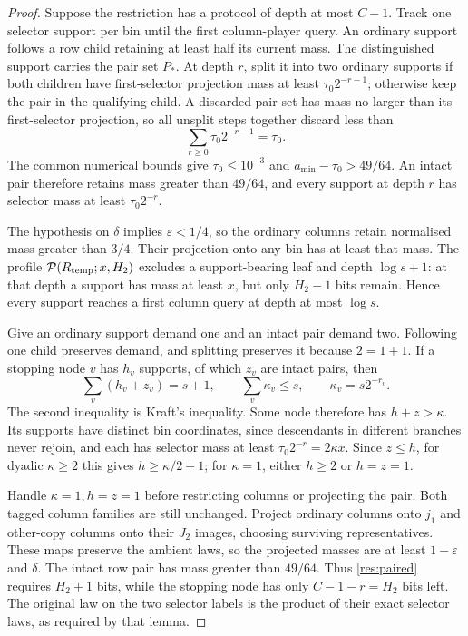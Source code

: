 \documentclass[11pt]{article} \usepackage[utf8]{inputenc}
\theoremstyle{plain} \newtheorem{theorem}{Theorem}[section]
\theoremstyle{definition} \newaliascnt{definition}{theorem}
\newcommand{\RP}[3]{\mathcal{P}(#1;#2,#3)}
\begin{document}
\begin{proof}
Suppose the restriction has a protocol of depth at most $C-1$. Track one
selector support per bin until the first column-player query. An ordinary
support follows a row child retaining at least half its current mass. The
distinguished support carries the pair set $P_*$. At depth $r$, split it into
two ordinary supports if both children have first-selector projection mass at
least $\tau_0 2^{-r-1}$; otherwise keep the pair in the qualifying child.
A discarded pair set has mass no larger than its first-selector projection,
so all unsplit steps together discard less than
\[
\sum_{r\ge0}\tau_0 2^{-r-1}=\tau_0.
\]
The common numerical bounds give
$\tau_0\le10^{-3}$ and $a_{\min}-\tau_0>49/64$. An intact pair therefore
retains mass greater than $49/64$, and every support at depth $r$ has selector
mass at least $\tau_0 2^{-r}$.

The hypothesis on $\delta$ implies $\varepsilon<1/4$, so the ordinary columns
retain normalised mass greater than $3/4$. Their projection onto any bin has
at least that mass. The profile $\RP{R_{\rm temp}}{x}{H_2}$ excludes a
support-bearing leaf and depth
$\log s+1$: at that depth a support has mass at least $x$, but only $H_2-1$
bits remain. Hence every support reaches a first column query at depth at
most $\log s$.

Give an ordinary support demand one and an intact pair demand two. Following
one child preserves demand, and splitting preserves it because $2=1+1$.
If a stopping node $v$ has $h_v$ supports, of which $z_v$ are intact pairs,
then
\[
\sum_v(h_v+z_v)=s+1,\qquad
\sum_v\kappa_v\le s,\qquad \kappa_v=s2^{-r_v}.
\]
The second inequality is Kraft's inequality. Some node therefore has
$h+z>\kappa$. Its supports have distinct bin coordinates, since descendants
in different branches never rejoin, and each has selector mass at least
$\tau_0 2^{-r}=2\kappa x$. Since $z\le h$, for dyadic $\kappa\ge2$ this gives
$h\ge\kappa/2+1$; for $\kappa=1$, either $h\ge2$ or $h=z=1$.

Handle $\kappa=1,h=z=1$ before restricting columns or projecting the pair.
Both tagged column families are still unchanged. Project ordinary columns
onto $j_1$ and other-copy columns onto their $J_2$ images, choosing surviving
representatives. These maps preserve the ambient laws, so the projected masses
are at least $1-\varepsilon$ and $\delta$. The intact row pair has mass greater
than $49/64$. Thus \cref{res:paired} requires $H_2+1$ bits, while the stopping
node has only $C-1-r=H_2$ bits left. The original law on the two selector
labels is the product of their exact selector laws, as required by that lemma.


\end{proof}
\end{document}
